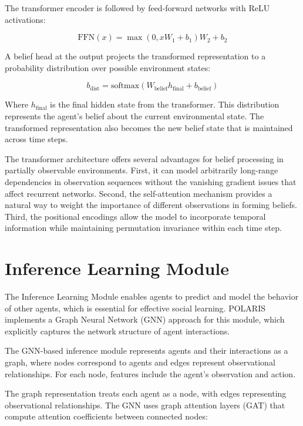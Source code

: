 The transformer encoder is followed by feed-forward networks with ReLU activations:

\begin{equation}
    \text{FFN}(x) = \max(0, xW_1 + b_1)W_2 + b_2
\end{equation}

A belief head at the output projects the transformed representation to a probability distribution over possible environment states:

\begin{equation}
    b_{\text{dist}} = \text{softmax}(W_{\text{belief}}h_{\text{final}} + b_{\text{belief}})
\end{equation}

Where $h_{\text{final}}$ is the final hidden state from the transformer. This distribution represents the agent's belief about the current environmental state. The transformed representation also becomes the new belief state that is maintained across time steps.

The transformer architecture offers several advantages for belief processing in partially observable environments. First, it can model arbitrarily long-range dependencies in observation sequences without the vanishing gradient issues that affect recurrent networks. Second, the self-attention mechanism provides a natural way to weight the importance of different observations in forming beliefs. Third, the positional encodings allow the model to incorporate temporal information while maintaining permutation invariance within each time step.

\section{Inference Learning Module}

The Inference Learning Module enables agents to predict and model the behavior of other agents, which is essential for effective social learning. POLARIS implements a Graph Neural Network (GNN) approach for this module, which explicitly captures the network structure of agent interactions.

The GNN-based inference module represents agents and their interactions as a graph, where nodes correspond to agents and edges represent observational relationships. For each node, features include the agent's observation and action.

The graph representation treats each agent as a node, with edges representing observational relationships. The GNN uses graph attention layers (GAT) that compute attention coefficients between connected nodes:

